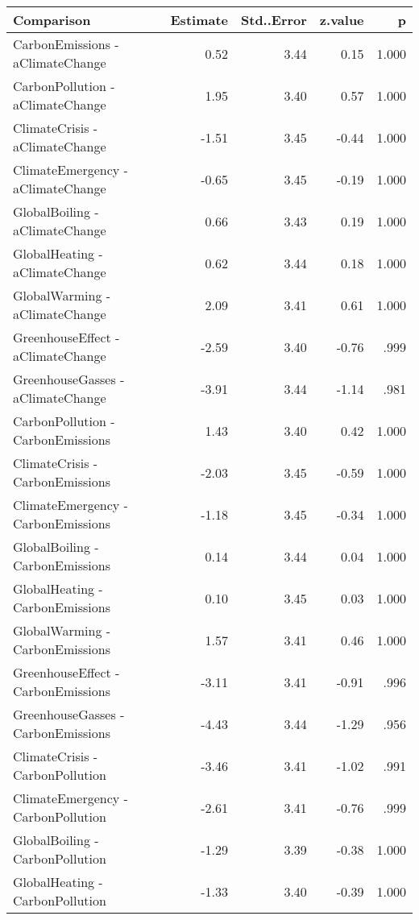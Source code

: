 \begin{table}[ht]
\centering
\begin{tabular}{lrrrr}
  \hline
Comparison & Estimate & Std..Error & z.value & p \\ 
  \hline
CarbonEmissions - aClimateChange & 0.52 & 3.44 & 0.15 & 1.000 \\ 
  CarbonPollution - aClimateChange & 1.95 & 3.40 & 0.57 & 1.000 \\ 
  ClimateCrisis - aClimateChange & -1.51 & 3.45 & -0.44 & 1.000 \\ 
  ClimateEmergency - aClimateChange & -0.65 & 3.45 & -0.19 & 1.000 \\ 
  GlobalBoiling - aClimateChange & 0.66 & 3.43 & 0.19 & 1.000 \\ 
  GlobalHeating - aClimateChange & 0.62 & 3.44 & 0.18 & 1.000 \\ 
  GlobalWarming - aClimateChange & 2.09 & 3.41 & 0.61 & 1.000 \\ 
  GreenhouseEffect - aClimateChange & -2.59 & 3.40 & -0.76 & .999 \\ 
  GreenhouseGasses - aClimateChange & -3.91 & 3.44 & -1.14 & .981 \\ 
  CarbonPollution - CarbonEmissions & 1.43 & 3.40 & 0.42 & 1.000 \\ 
  ClimateCrisis - CarbonEmissions & -2.03 & 3.45 & -0.59 & 1.000 \\ 
  ClimateEmergency - CarbonEmissions & -1.18 & 3.45 & -0.34 & 1.000 \\ 
  GlobalBoiling - CarbonEmissions & 0.14 & 3.44 & 0.04 & 1.000 \\ 
  GlobalHeating - CarbonEmissions & 0.10 & 3.45 & 0.03 & 1.000 \\ 
  GlobalWarming - CarbonEmissions & 1.57 & 3.41 & 0.46 & 1.000 \\ 
  GreenhouseEffect - CarbonEmissions & -3.11 & 3.41 & -0.91 & .996 \\ 
  GreenhouseGasses - CarbonEmissions & -4.43 & 3.44 & -1.29 & .956 \\ 
  ClimateCrisis - CarbonPollution & -3.46 & 3.41 & -1.02 & .991 \\ 
  ClimateEmergency - CarbonPollution & -2.61 & 3.41 & -0.76 & .999 \\ 
  GlobalBoiling - CarbonPollution & -1.29 & 3.39 & -0.38 & 1.000 \\ 
  GlobalHeating - CarbonPollution & -1.33 & 3.40 & -0.39 & 1.000 \\ 

\end{tabular}
\end{table}
